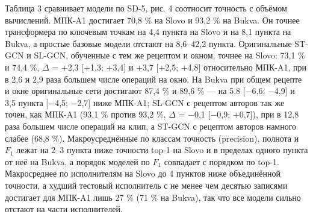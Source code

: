 Таблица 3 сравнивает модели по SD-5, рис. 4 соотносит точность с объёмом вычислений. МПК-A1 достигает 70,8 \% на Slovo и 93,2 \% на Bukva. Он точнее трансформера по ключевым точкам на 4,4 пункта на Slovo и на 8,1 пункта на Bukva, а простые базовые модели отстают на 8,6--42,2 пункта. Оригинальные ST-GCN и SL-GCN, обученные с тем же рецептом и окном, точнее на Slovo: 73,1 \% и 74,4 \%, \(\Delta\) = +2,3 {[}+1,3; +3,4{]} и +3,7 {[}+2,5; +4,8{]} относительно МПК-A1, при в 2,6 и 2,9 раза большем числе операций на окно. На Bukva при общем рецепте и окне оригинальные сети достигают 87,4 \% и 89,6 \% --- на 5,8 {[}−6,6; −4,9{]} и 3,5 пункта {[}−4,5; −2,7{]} ниже МПК-A1; SL-GCN с рецептом авторов так же точен, как МПК-A1 (93,1 \% против 93,2 \%, \(\Delta\) = −0,1 {[}−0,9; +0,7{]}), при в 12,8 раза большем числе операций на клип, а ST-GCN с рецептом авторов намного слабее (68,8 \%). Макроусреднённые по классам точность (precision), полнота и \(F_1\) лежат на 2--3 пункта ниже точности top-1 на Slovo и в пределах одного пункта от неё на Bukva, а порядок моделей по \(F_1\) совпадает с порядком по top-1. Макросреднее по исполнителям на Slovo до 4 пунктов ниже объединённой точности, а худший тестовый исполнитель с не менее чем десятью записями достигает для МПК-A1 лишь 27 \% (71 \% на Bukva), так что все модели сильно отстают на части исполнителей.

